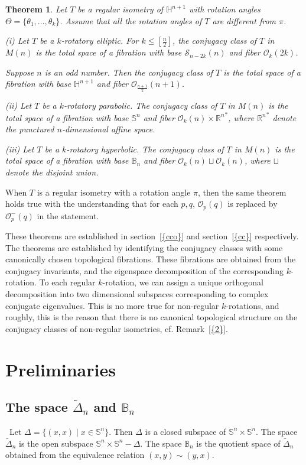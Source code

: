 \documentclass[11pt]{amsart}
\newtheorem{theorem}{Theorem}[section]
\theoremstyle{definition}
\theoremstyle{remark}
\numberwithin{equation}{section}
\theoremstyle{plain}
\begin{document}
\begin{theorem}\label{tcc}
Let $T$ be a regular isometry of ${\mathbb H}^{n+1}$ with rotation angles  $\Theta=\{\theta_1,...,\theta_k\}$. Assume that all the rotation angles of $T$ are different from $\pi$. 

(i) Let $T$ be a  $k$-rotatory elliptic. For $k \leq [ \frac{n}{2}]$, the conjugacy class of $T$  in $M(n)$ is the total space of a fibration with base $\mathcal S_{n-2k} (n)$ and fiber ${\mathcal O}_{k} (2k)$.

   Suppose $n$ is an odd number. Then the conjugacy class of $T$  is the total space of a fibration with base ${\mathbb H}^{n+1}$ and fiber ${\mathcal O}_{\frac{n+1}{2}} (n + 1)$.

(ii) Let $T$ be a $k$-rotatory parabolic. The conjugacy class of  $T$ in $M(n)$ is the total space of a fibration with base ${\mathbb S}^n$ and fiber ${\mathcal O}_{k} (n) \times {{\mathbb R}^n}^{\ast}$, where ${{\mathbb R}^n}^{\ast}$ denote the punctured $n$-dimensional affine space.
  
(iii) Let $T$ be a  $k$-rotatory hyperbolic.   The  conjugacy class of  $T$  in $M(n)$  is the total space of a fibration with base ${\mathbb B}_n$ and fiber ${\mathcal O}_{k}(n) \sqcup {\mathcal O}_k(n)$, where $\sqcup$ denote the disjoint union.
\end{theorem}
When $T$ is a regular isometry with a rotation angle $\pi$, then the same theorem holds true with the understanding that for each $p, q$, ${\mathcal O}_p(q)$ is replaced by ${\mathcal O}^-_p(q)$ in the statement. 

These theorems are established in {section~\ref{{cco}}} and {section~\ref{{cc}}} respectively.  The theorems are established by identifying the conjugacy classes with some canonically chosen topological fibrations. These fibrations are obtained from the conjugacy invariants, and the eigenspace decomposition of the  corresponding $k$-rotation. To each regular $k$-rotation, we can assign a unique orthogonal decomposition into two dimensional subspaces corresponding to complex conjugate eigenvalues. This is no more true for non-regular $k$-rotations, and roughly, this is the reason that there is no canonical topological structure on the conjugacy classes of non-regular isometries, cf. {Remark~\ref{{2}}}. 

\section{Preliminaries}\label{prel}
\subsection{The space $\tilde \Delta_n$ and ${\mathbb B}_n$}
\ Let $\Delta=\{(x,x)\;|\;x \in {\mathbb S}^n\}$. Then $\Delta$ is a closed subspace of ${\mathbb S}^n \times {\mathbb S}^n$. The space $\tilde \Delta_n$ is the open subspace ${\mathbb S}^n \times {\mathbb S}^n-\Delta$. The space ${\mathbb B}_n$ is the quotient space of $\tilde \Delta_n$ obtained from the equivalence relation $(x,y) \sim (y,x)$. 
\end{document}
